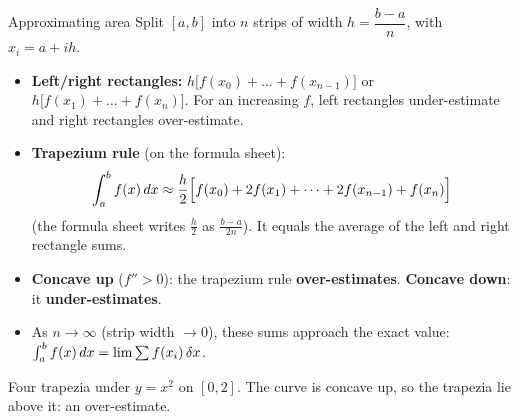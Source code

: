 \begin{cols}[0.55]
\begin{keyres}{Approximating area}
Split $[a,b]$ into $n$ strips of width $h=\dfrac{b-a}{n}$, with $x_i=a+ih$.
\begin{itemize}
  \item \textbf{Left/right rectangles:} $h\big[f(x_0)+\dots+f(x_{n-1})\big]$ or $h\big[f(x_1)+\dots+f(x_n)\big]$. For an increasing $f$, left rectangles under-estimate and right rectangles over-estimate.
  \item \textbf{Trapezium rule} (on the formula sheet):
  \[\int_a^bf(x)\,dx\approx\frac{h}{2}\Big[f(x_0)+2f(x_1)+\dots+2f(x_{n-1})+f(x_n)\Big]\]
  (the formula sheet writes $\frac h2$ as $\frac{b-a}{2n}$). It equals the average of the left and right rectangle sums.
  \item \textbf{Concave up} ($f''>0$): the trapezium rule \textbf{over-estimates}. \textbf{Concave down}: it \textbf{under-estimates}.
  \item As $n\to\infty$ (strip width $\to0$), these sums approach the exact value: $\int_a^bf(x)\,dx=\lim\sum f(x_i)\,\delta x$.
\end{itemize}
\end{keyres}
\nextcol[0.425]
\centering
{}

{\scriptsize Four trapezia under $y=x^2$ on $[0,2]$. The curve is concave up, so the trapezia lie above it: an over-estimate.}
\end{cols}


